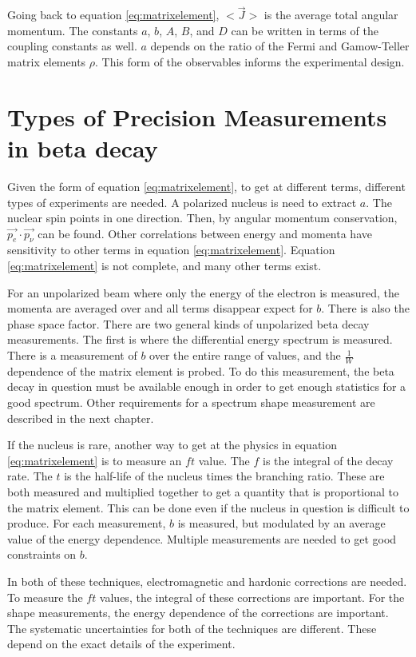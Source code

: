 \documentclass[../MaxHughesThesis.tex]{subfiles}
\begin{document}
Going back to equation \ref{eq:matrixelement}, $<\vec{J}>$ is the average total angular momentum. 
The constants $a$, $b$, $A$, $B$, and $D$ can be written in terms of the coupling constants as well.
$a$ depends on the ratio of the Fermi and Gamow-Teller matrix elements $\rho$.
This form of the observables informs the experimental design. 

\section{Types of Precision Measurements in beta decay}
Given the form of equation \ref{eq:matrixelement}, to get at different terms, different types of experiments are needed.
A polarized nucleus is need to extract $a$. 
The nuclear spin points in one direction. 
Then, by angular momentum conservation, $\vec{p_{e}} \cdot \vec{p_{\nu}}$ can be found.
Other correlations between energy and momenta have sensitivity to other terms in equation \ref{eq:matrixelement}.
Equation \ref{eq:matrixelement} is not complete, and many other terms exist. 

For an unpolarized beam where only the energy of the electron is measured, the momenta are averaged over and all terms disappear expect for $b$.
There is also the phase space factor.
There are two general kinds of unpolarized beta decay measurements.
The first is where the differential energy spectrum is measured.
There is a measurement of $b$ over the entire range of values, and the $\frac{1}{W}$ dependence of the matrix element is probed.
To do this measurement, the beta decay in question must be available enough in order to get enough statistics for a good spectrum.
Other requirements for a spectrum shape measurement are described in the next chapter.

If the nucleus is rare, another way to get at the physics in equation \ref{eq:matrixelement} is to measure an $ft$ value.
The $f$ is the integral of the decay rate.
The $t$ is the half-life of the nucleus times the branching ratio.
These are both measured and multiplied together to get a quantity that is proportional to the matrix element.
This can be done even if the nucleus in question is difficult to produce.
For each measurement, $b$ is measured, but modulated by an average value of the energy dependence.
Multiple measurements are needed to get good constraints on $b$.

In both of these techniques, electromagnetic and hardonic corrections are needed.
To measure the $ft$ values, the integral of these corrections are important.
For the shape measurements, the energy dependence of the corrections are important.
The systematic uncertainties for both of the techniques are different.
These depend on the exact details of the experiment.
\end{document}
